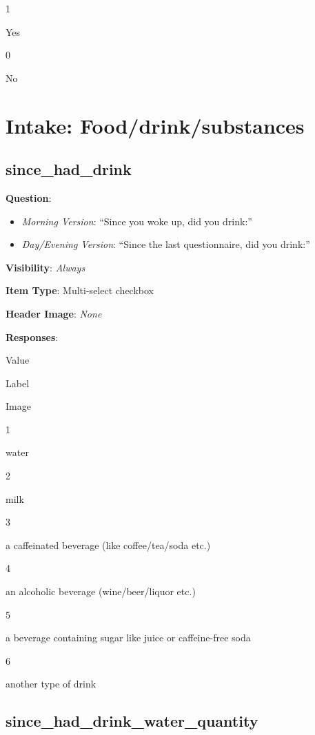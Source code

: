 \documentclass[]{book}
\providecommand{\tightlist}{%
  \setlength{\itemsep}{0pt}\setlength{\parskip}{0pt}}
\begin{document}
1

Yes

0

No

\hypertarget{intake_section}{%
\chapter{Intake: Food/drink/substances}\label{intake_section}}

\hypertarget{since_had_drink}{%
\section{since\_had\_drink}\label{since_had_drink}}

\textbf{Question}:

\begin{itemize}
\tightlist
\item
  \emph{Morning Version}: ``Since you woke up, did you drink:''
\item
  \emph{Day/Evening Version}: ``Since the last questionnaire, did you drink:''
\end{itemize}

\textbf{Visibility}: \emph{Always}

\textbf{Item Type}: Multi-select checkbox

\textbf{Header Image}: \emph{None}

\textbf{Responses}:

Value

Label

Image

1

water

2

milk

3

a caffeinated beverage (like coffee/tea/soda etc.)

4

an alcoholic beverage (wine/beer/liquor etc.)

5

a beverage containing sugar like juice or caffeine-free soda

6

another type of drink

\hypertarget{since_had_drink_water_quantity}{%
\section{since\_had\_drink\_water\_quantity}\label{since_had_drink_water_quantity}}
\end{document}
